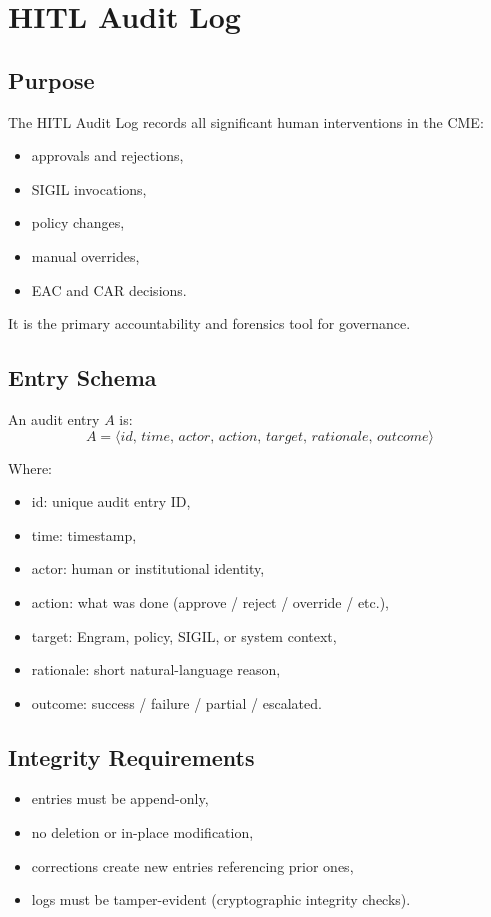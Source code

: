 \chapter{HITL Audit Log}
\label{chap:HITL_Audit_Log}

\section{Purpose}

The HITL Audit Log records all significant human interventions in the CME:
\begin{itemize}
    \item approvals and rejections,
    \item SIGIL invocations,
    \item policy changes,
    \item manual overrides,
    \item EAC and CAR decisions.
\end{itemize}

It is the primary accountability and forensics tool for governance.

\section{Entry Schema}

An audit entry $A$ is:
\[
A = \langle id,\, time,\, actor,\, action,\, target,\, rationale,\, outcome \rangle
\]

Where:
\begin{itemize}
    \item id: unique audit entry ID,
    \item time: timestamp,
    \item actor: human or institutional identity,
    \item action: what was done (approve / reject / override / etc.),
    \item target: Engram, policy, SIGIL, or system context,
    \item rationale: short natural-language reason,
    \item outcome: success / failure / partial / escalated.
\end{itemize}

\section{Integrity Requirements}

\begin{itemize}
    \item entries must be append-only,
    \item no deletion or in-place modification,
    \item corrections create new entries referencing prior ones,
    \item logs must be tamper-evident (cryptographic integrity checks).
\end{itemize}

